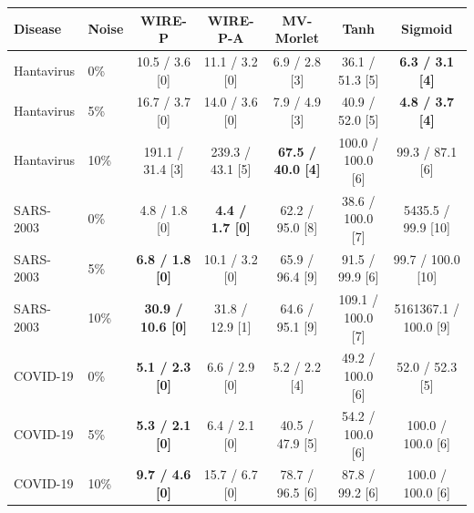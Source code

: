 \begin{tabular}{llccccc}
\toprule
Disease & Noise & WIRE-P & WIRE-P-A & MV-Morlet & Tanh & Sigmoid \\
\midrule
Hantavirus & 0\% & 10.5 / 3.6 [0] & 11.1 / 3.2 [0] & 6.9 / 2.8 [3] & 36.1 / 51.3 [5] & \textbf{6.3 / 3.1 [4]} \\
Hantavirus & 5\% & 16.7 / 3.7 [0] & 14.0 / 3.6 [0] & 7.9 / 4.9 [3] & 40.9 / 52.0 [5] & \textbf{4.8 / 3.7 [4]} \\
Hantavirus & 10\% & 191.1 / 31.4 [3] & 239.3 / 43.1 [5] & \textbf{67.5 / 40.0 [4]} & 100.0 / 100.0 [6] & 99.3 / 87.1 [6] \\
\midrule
SARS-2003 & 0\% & 4.8 / 1.8 [0] & \textbf{4.4 / 1.7 [0]} & 62.2 / 95.0 [8] & 38.6 / 100.0 [7] & 5435.5 / 99.9 [10] \\
SARS-2003 & 5\% & \textbf{6.8 / 1.8 [0]} & 10.1 / 3.2 [0] & 65.9 / 96.4 [9] & 91.5 / 99.9 [6] & 99.7 / 100.0 [10] \\
SARS-2003 & 10\% & \textbf{30.9 / 10.6 [0]} & 31.8 / 12.9 [1] & 64.6 / 95.1 [9] & 109.1 / 100.0 [7] & 5161367.1 / 100.0 [9] \\
\midrule
COVID-19 & 0\% & \textbf{5.1 / 2.3 [0]} & 6.6 / 2.9 [0] & 5.2 / 2.2 [4] & 49.2 / 100.0 [6] & 52.0 / 52.3 [5] \\
COVID-19 & 5\% & \textbf{5.3 / 2.1 [0]} & 6.4 / 2.1 [0] & 40.5 / 47.9 [5] & 54.2 / 100.0 [6] & 100.0 / 100.0 [6] \\
COVID-19 & 10\% & \textbf{9.7 / 4.6 [0]} & 15.7 / 6.7 [0] & 78.7 / 96.5 [6] & 87.8 / 99.2 [6] & 100.0 / 100.0 [6] \\
\bottomrule
\end{tabular}